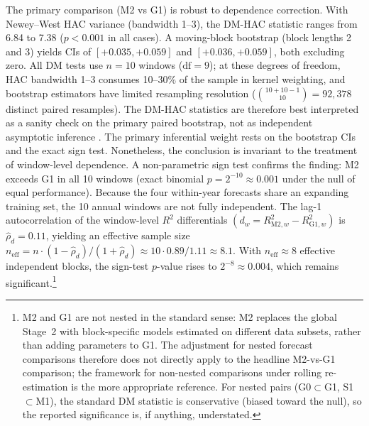 \documentclass[11pt,a4paper]{article}
\begin{document}
The primary comparison (M2 vs G1) is robust to dependence correction. With Newey--West HAC variance (bandwidth 1--3), the DM-HAC statistic ranges from 6.84 to 7.38 ($p < 0.001$ in all cases). A moving-block bootstrap (block lengths 2 and 3) yields CIs of $[+0.035, +0.059]$ and $[+0.036, +0.059]$, both excluding zero. All DM tests use $n = 10$ windows ($\mathrm{df} = 9$); at these degrees of freedom, HAC bandwidth 1--3 consumes 10--30\% of the sample in kernel weighting, and bootstrap estimators have limited resampling resolution ($\binom{10+10-1}{10} = 92{,}378$ distinct paired resamples). The DM-HAC statistics are therefore best interpreted as a sanity check on the primary paired bootstrap, not as independent asymptotic inference \citep[cf.][for finite-sample bias in HAC estimators]{kiefer2005new}. The primary inferential weight rests on the bootstrap CIs and the exact sign test. Nonetheless, the conclusion is invariant to the treatment of window-level dependence. A non-parametric sign test confirms the finding: M2 exceeds G1 in all 10 windows (exact binomial $p = 2^{-10} \approx 0.001$ under the null of equal performance). Because the four within-year forecasts share an expanding training set, the 10 annual windows are not fully independent. The lag-1 autocorrelation of the window-level $R^2$ differentials $(d_w = R^2_{\mathrm{M2},w} - R^2_{\mathrm{G1},w})$ is $\hat\rho_d = 0.11$, yielding an effective sample size $n_{\mathrm{eff}} = n \cdot (1 - \hat\rho_d)/(1 + \hat\rho_d) \approx 10 \cdot 0.89/1.11 \approx 8.1$. With $n_{\mathrm{eff}} \approx 8$ effective independent blocks, the sign-test $p$-value rises to $2^{-8} \approx 0.004$, which remains significant.\footnote{M2 and G1 are not nested in the standard sense: M2 replaces the global Stage~2 with block-specific models estimated on different data subsets, rather than adding parameters to G1. The \citet{clark2007approximately} adjustment for nested forecast comparisons therefore does not directly apply to the headline M2-vs-G1 comparison; the \citet{giacomini2006tests} framework for non-nested comparisons under rolling re-estimation is the more appropriate reference. For nested pairs (G0$\subset$G1, S1$\subset$M1), the standard DM statistic is conservative (biased toward the null), so the reported significance is, if anything, understated.}
\end{document}
